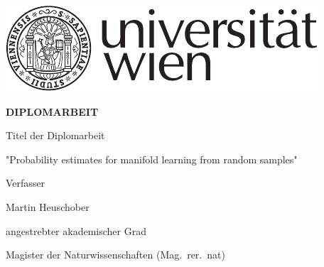 \begin{titlepage}
\vspace*{-2cm}  %
\begin{flushright}
    \includegraphics{RZ_Logo_Uni_black_01}
\end{flushright}
\vspace{1cm}

\begin{center}  %
    \Huge{\textbf{\textsf{\MakeUppercase{
        Diplomarbeit
    }}}}
    \vspace{2cm}

    \large{\textsf{%
        Titel der Diplomarbeit
    }}
    \vspace{.1cm}

    \LARGE{\textsf{%
        "Probability estimates for manifold learning from random samples"
    }}
    \vspace{3cm}

    \large{\textsf{  %
        Verfasser
    }}

    \Large{\textsf{  %
        Martin Heuschober
    }}
    \vspace{3cm}

    \large{\textsf{
        angestrebter akademischer Grad  %
    }}

    \Large{\textsf{  %
        Magister der Naturwissenschaften (Mag.\ rer.\ nat)
    }}
\end{center}
\vspace{2cm}


\end{titlepage}
